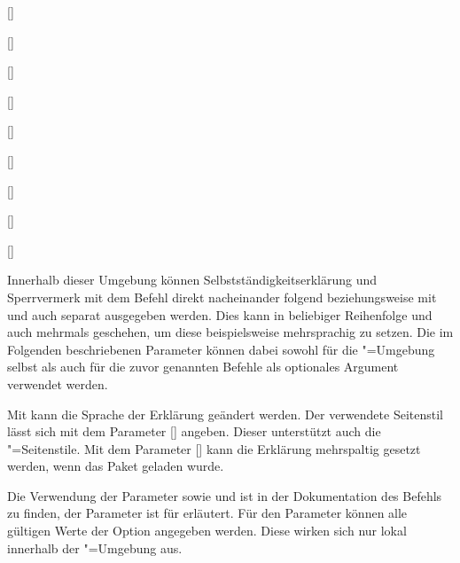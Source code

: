 \begin{Declaration}[v2.02]{[\LParameter]}
\begin{Declaration}{[]}
\begin{Declaration}[v2.02]{%
  []%
}
\begin{Declaration}[v2.02]{%
  []%
}
\begin{Declaration}{[\PSet]}
\begin{Declaration}{%
  []
}
\begin{Declaration}{[]}
\begin{Declaration}{[]}
\begin{Declaration}{[]}

\printdeclarationlist%
%
%
Innerhalb dieser Umgebung können Selbstständigkeitserklärung und Sperrvermerk 
mit dem Befehl  direkt nacheinander folgend beziehungsweise 
mit  und  auch separat ausgegeben werden. 
Dies kann in beliebiger Reihenfolge und auch mehrmals geschehen, um diese 
beispielsweise mehrsprachig zu setzen. Die im Folgenden beschriebenen Parameter 
können dabei sowohl für die "=Umgebung selbst als 
auch für die zuvor genannten Befehle als optionales Argument verwendet werden.

Mit  kann die Sprache der Erklärung 
geändert werden. Der verwendete Seitenstil lässt sich mit dem Parameter 
[] angeben. 
Dieser unterstützt auch die "=Seitenstile. Mit dem 
Parameter [] kann die 
Erklärung mehrspaltig gesetzt werden, wenn das Paket  geladen 
wurde.

Die Verwendung der Parameter  sowie
 und  ist 
in der Dokumentation des Befehls  zu finden, der Parameter 
 ist für  erläutert. Für den 
Parameter  können alle gültigen Werte 
der Option  angegeben werden. Diese wirken sich nur lokal 
innerhalb der "=Umgebung aus.
\end{Declaration}
\end{Declaration}
\end{Declaration}
\end{Declaration}
\end{Declaration}
\end{Declaration}
\end{Declaration}
\end{Declaration}
\end{Declaration}

